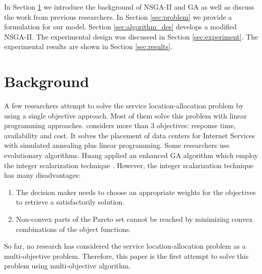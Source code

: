 \documentclass{llncs}
\begin{document}
In Section \ref{sec:Background} we introduce the background of NSGA-II and GA as well as discuss the work from previous researchers.
In Section \ref{sec:problem} we provide a formulation for our model. Section \ref{sec:algorithm_des} develops a modified NSGA-II. 
The experimental design was discussed in Section \ref{sec:experiment}. The experimental results are shown in Section \ref{sec:results}.


\section{Background}
\label{sec:Background}
A few researchers attempt to solve the service location-allocation problem by using a single objective approach. Most of them solve this problem with linear programming approaches.
\cite{5961695} considers more than 3 objectives: response time, availability and cost. 
It solves the placement of data centers for Internet Services with simulated annealing plus linear programming. 
Some researchers use evolutionary algorithms. Huang \cite{EnhancedGenetic} applied an enhanced GA algorithm which employ the integer scalarization technique \cite{Multiobjective}. However, 
the integer scalarization technique has many disadvantages:
\begin{enumerate}
	\item The decision maker needs to choose an appropriate weights for the objectives to retrieve a satisfactorily solution.
	\item Non-convex parts of the Pareto set cannot be reached by minimizing convex combinations of the object functions.
\end{enumerate}

So far, no research has considered the service location-allocation problem as a multi-objective problem. Therefore, this paper is the first attempt to solve this problem using 
multi-objective algorithm.
\end{document}
